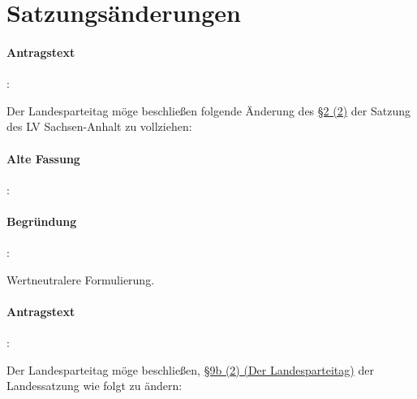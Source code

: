 \section{Satzungsänderungen}

\paragraph{Antragstext}:

Der Landesparteitag möge beschließen folgende Änderung des \href{http://wiki.piratenpartei.de/LSA:Satzung#.C2.A7_2_-_Mitgliedschaft}{§2 (2)} der Satzung des LV Sachsen-Anhalt zu vollziehen:


\paragraph{Alte Fassung}:


\paragraph{Begründung}:

Wertneutralere Formulierung. 



\paragraph{Antragstext}:

Der Landesparteitag möge beschließen, \href{http://wiki.piratenpartei.de/LSA:Satzung#.C2.A7_9b_-_Der_Landesparteitag}{§9b (2) (Der Landesparteitag)} der Landessatzung wie folgt zu ändern:

